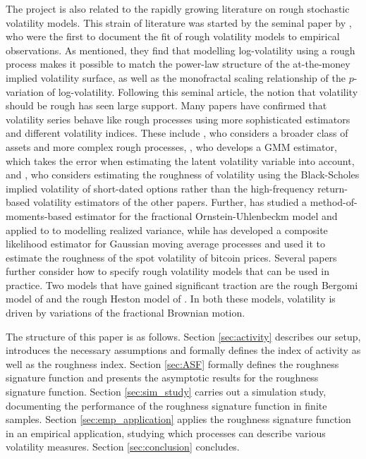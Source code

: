 \documentclass[fleqn,11pt,letterpaper]{article}
\theoremstyle{plain}
\theoremstyle{definition}
\theoremstyle{remark}
\numberwithin{equation}{section}
\begin{document}
The project is also related to the rapidly growing literature on rough stochastic volatility models. This strain of literature was started by the seminal paper by \cite{Gatheral2018}, who were the first to document the fit of rough volatility models to empirical observations. As mentioned, they find that modelling log-volatility using a rough process makes it possible to match the power-law structure of the at-the-money implied volatility surface, as well as the monofractal scaling relationship of the $p$-variation of log-volatility. Following this seminal article, the notion that volatility should be rough has seen large support. Many papers have confirmed that volatility series behave like rough processes using more sophisticated estimators and different volatility indices. These include \cite{Bennedsen2021}, who considers a broader class of assets and more complex rough processes,  \cite{BCSV2020}, who develops a GMM estimator, which takes the error when estimating the latent volatility variable into account, and \cite{LivieriEtAl2018}, who considers estimating the roughness of volatility using the Black-Scholes implied volatility of short-dated options rather than the high-frequency return-based volatility estimators of the other papers. Further, \cite{WangEtAl2023} has studied a method-of-moments-based estimator for the fractional Ornstein-Uhlenbeckm model and applied to to modelling realized variance, while \cite{BennedsenEtAl2023} has developed a composite likelihood estimator for Gaussian moving average processes and used it to estimate the roughness of the spot volatility of bitcoin prices. Several papers further consider how to specify rough volatility models that can be used in practice. Two models that have gained significant traction are the rough Bergomi model of \cite{Bayer2016a} and the rough Heston model of \cite{ElEuch2018}. In both these models, volatility is driven by variations of the fractional Brownian motion.

The structure of this paper is as follows. Section \ref{sec:activity} describes our setup, introduces the necessary assumptions and formally defines the index of activity as well as the roughness index.  Section \ref{sec:ASF} formally defines the roughness signature function and presents the asymptotic results for the roughness signature function. Section \ref{sec:sim_study} carries out a simulation study, documenting the performance of the roughness signature function in finite samples. Section \ref{sec:emp_application} applies the roughness signature function in an empirical application, studying which processes can describe various volatility measures. Section \ref{sec:conclusion} concludes. 
\end{document}
